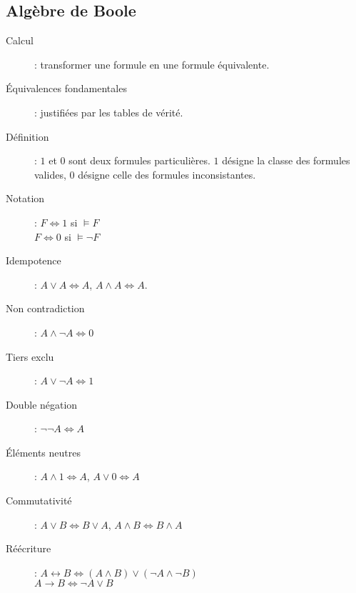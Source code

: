 \documentclass[10pt,a4paper]{article}
\begin{document}
	\subsection{Algèbre de Boole}
		\begin{description}
			\item[Calcul]: transformer une formule en une formule équivalente.
			\item[Équivalences fondamentales]: justifiées par les tables de vérité.
			\item[Définition]: $1$ et $0$ sont deux formules particulières. $1$ désigne la classe des formules valides, $0$ désigne celle des formules inconsistantes.
			\item[Notation]: $F\Leftrightarrow 1$ si $\vDash F$\\$F\Leftrightarrow 0$ si $\vDash\neg F$
			\item[Idempotence]: $A\vee A\Leftrightarrow A$, $A\wedge A\Leftrightarrow A$.
			\item[Non contradiction]: $A\wedge\neg A\Leftrightarrow 0$
			\item[Tiers exclu]: $A\vee\neg A\Leftrightarrow 1$
			\item[Double négation]: $\neg\neg A \Leftrightarrow A$
			\item[Éléments neutres]: $A\wedge 1 \Leftrightarrow A$, $A\vee 0 \Leftrightarrow A$
			\item[Commutativité]: $A\vee B\Leftrightarrow B\vee A$, $A\wedge B\Leftrightarrow B\wedge A$
			\item[Réécriture]: $A\leftrightarrow B \Leftrightarrow (A\wedge B)\vee (\neg A\wedge\neg B)$\\$A\rightarrow B \Leftrightarrow \neg A\vee B$
			
		\end{description}
\end{document}
